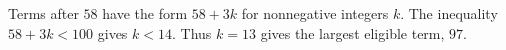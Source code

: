 Terms after $58$ have the form $58+3k$ for nonnegative integers $k$. The inequality $58+3k<100$ gives $k<14$. Thus $k=13$ gives the largest eligible term, $\boxed{97}$.
